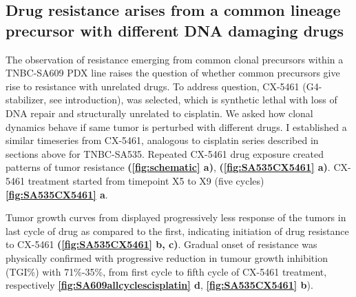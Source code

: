 
\subsection{Drug resistance arises from a common lineage precursor with different DNA damaging drugs}
The observation of resistance emerging from common clonal precursors within a TNBC-SA609 PDX line raises the question of whether common precursors give rise to resistance with unrelated drugs. To address question, CX-5461 (G4-stabilizer, see introduction), was selected, which is synthetic lethal with loss of DNA repair and structurally unrelated to cisplatin. We asked how clonal dynamics behave if same tumor is perturbed with different drugs. 
 I established a similar timeseries from CX-5461, analogous to cisplatin series described in sections above for TNBC-SA535. Repeated CX-5461 drug exposure created patterns of tumor resistance \textbf{(\autoref{fig:schematic} a)},  \textbf{(\autoref{fig:SA535CX5461} a)}. CX-5461 treatment started from timepoint X5 to X9 (five cycles) \textbf{\autoref{fig:SA535CX5461} a}. 
 
Tumor growth curves from displayed progressively less response of the tumors in last cycle of drug as compared to the first, indicating initiation of drug resistance to CX-5461 \textbf{(\autoref{fig:SA535CX5461} b, c)}. 
Gradual onset of resistance was physically confirmed with progressive reduction in tumour growth inhibition (TGI\%) with 71\%-35\%, from first cycle to fifth cycle of CX-5461 treatment, respectively \textbf{\autoref{fig:SA609allcyclescisplatin} d}, \textbf{\autoref{fig:SA535CX5461} b}). 
 


